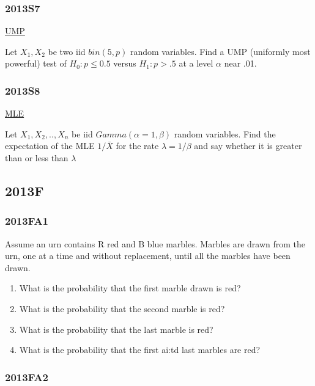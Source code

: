 \documentclass[10pt,twocolumn,portrait]{article}
\begin{document}
\hypertarget{s7-2}{%
\subsubsection{2013S7}\label{s7-2}}

\protect\hyperlink{section-7}{UMP}

Let \(X_1,X_2\) be two iid \(bin(5,p)\) random variables. Find a UMP
(uniformly most powerful) test of \(H_0: p\le 0.5\) versus \(H_1: p>.5\)
at a level \(\alpha\) near .01.

\hypertarget{s8-2}{%
\subsubsection{2013S8}\label{s8-2}}

\protect\hyperlink{MLE}{MLE}

Let \(X_1,X_2,..,X_{n}\) be iid \(Gamma(\alpha=1,\beta)\) random
variables. Find the expectation of the MLE \(1/\bar X\) for the rate
\(\lambda=1/\beta\) and say whether it is greater than or less than
\(\lambda\)

\hypertarget{f-8}{%
\subsection{2013F}\label{f-8}}

\hypertarget{fa1-2}{%
\subsubsection{2013FA1}\label{fa1-2}}

Assume an urn contains R red and B blue marbles. Marbles are drawn from
the urn, one at a time and without replacement, until all the marbles
have been drawn.

\begin{enumerate}
\def\labelenumi{(\alph{enumi})}
\item
  What is the probability that the first marble drawn is red?
\item
  What is the probability that the second marble is red?
\item
  What is the probability that the last marble is red?
\item
  What is the probability that the first ai:td last marbles are red?
\end{enumerate}

\hypertarget{fa2-2}{%
\subsubsection{2013FA2}\label{fa2-2}}
\end{document}
